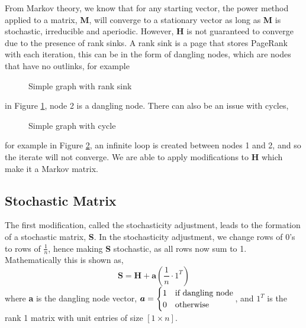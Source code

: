 \documentclass[11pt]{report}
\begin{document}
From Markov theory, we know that for any starting vector, the power method applied to a matrix, \textbf{M},  will converge to a stationary vector as long as \textbf{M} is stochastic, irreducible and aperiodic. However, \textbf{H} is not guaranteed to converge due to the presence of rank sinks. A rank sink is a page that stores PageRank with each iteration, this can be in the form of dangling nodes, which are nodes that have no outlinks, for example 
\begin{figure}[h]
\centering
{} \caption{Simple graph with rank sink} \label{fig:dangling} 
\end{figure} in Figure \ref{fig:dangling}, node 2 is a dangling node. There can also be an issue with cycles,
\begin{figure}[h]
\centering
{} \caption{Simple graph with cycle} \label{fig:cycle}
\end{figure} for example in Figure \ref{fig:cycle}, an infinite loop is created between nodes 1 and 2, and so the iterate will not converge. We are able to apply modifications to \textbf{H} which make it a Markov matrix.

\subsection{Stochastic Matrix} \label{sec:stoc}
The first modification, called the stochasticity adjustment, leads to the formation of a stochastic matrix, \textbf{S}. In the stochasticity adjustment, we change rows of 0's to rows of $\frac{1}{n}$, hence making \textbf{S} stochastic, as all rows now sum to 1. Mathematically this is shown as, 
\begin{equation*} \label{eq:s}
\textbf{S} = \textbf{H} + \textbf{a}\left(\frac{1}{n}\cdot 1^{T}\right)
\end{equation*} 
where \textbf{a} is the dangling node vector, \(\boldsymbol{a} = \begin{cases} 1 & \textnormal{if dangling node} \\ 0 & \textnormal{otherwise} \end{cases}\), and $1^T$ is the rank 1 matrix with unit entries of size $[1\times n]$.
\end{document}
